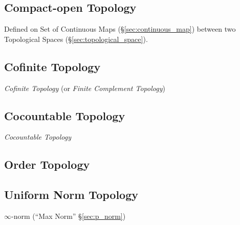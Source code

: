 \subsection{Compact-open Topology}\label{sec:compact_open}

Defined on Set of Continuous Maps (\S\ref{sec:continuous_map}) between
two Topological Spaces (\S\ref{sec:topological_space}).



\subsection{Cofinite Topology}\label{sec:cofinite_topology}

\emph{Cofinite Topology} (or \emph{Finite Complement Topology})



\subsection{Cocountable Topology}\label{sec:cocountable_topology}

\emph{Cocountable Topology}



\subsection{Order Topology}\label{sec:order_topology}

\subsection{Uniform Norm Topology}\label{sec:uniform_norm_topology}

$\infty$-norm (``Max Norm'' \S\ref{sec:p_norm})

